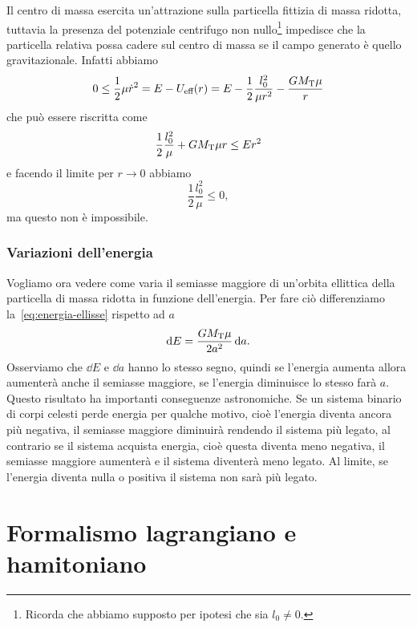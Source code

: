 Il centro di massa esercita un'attrazione sulla particella fittizia di massa
ridotta, tuttavia la presenza del potenziale centrifugo non
nullo\footnote{Ricorda che abbiamo supposto per ipotesi che sia $l_0\neq 0$.}
impedisce che la particella relativa possa cadere sul centro di massa se il
campo generato è quello gravitazionale. Infatti abbiamo
\begin{equation}
  0\leq \frac{1}{2}\mu\dot{r}^2 = E - U_\textup{eff}(r) = E -
  \frac{1}{2}\frac{l_0^2}{\mu r^2} - \frac{GM_\textup{T}\mu}{r}
\end{equation}
che può essere riscritta come
\begin{equation}
  \frac{1}{2}\frac{l_0^2}{\mu} + GM_\textup{T}\mu r \leq Er^2
\end{equation}
e facendo il limite per $r \to 0$ abbiamo
\begin{equation}
  \frac{1}{2}\frac{l_0^2}{\mu} \leq 0,
\end{equation}
ma questo non è impossibile.

\subsubsection{Variazioni dell'energia}
\label{sec:variazioni energia}

Vogliamo ora vedere come varia il semiasse maggiore di un'orbita ellittica della
particella di massa ridotta in funzione dell'energia. Per fare ciò differenziamo
la~\eqref{eq:energia-ellisse} rispetto ad $a$
\begin{equation}
  \mathop{}\!\mathrm{d} E = \frac{GM_\textup{T}\mu}{2a^2}\mathop{}\!\mathrm{d} a.
\end{equation}
Osserviamo che $\dd E$ e $\dd a$ hanno lo stesso segno, quindi se l'energia
aumenta allora aumenterà anche il semiasse maggiore, se l'energia diminuisce lo
stesso farà $a$. Questo risultato ha importanti conseguenze astronomiche. Se un
sistema binario di corpi celesti perde energia per qualche motivo, cioè
l'energia diventa ancora più negativa, il semiasse maggiore diminuirà rendendo
il sistema più legato, al contrario se il sistema acquista energia, cioè questa
diventa meno negativa, il semiasse maggiore aumenterà e il sistema diventerà
meno legato. Al limite, se l'energia diventa nulla o positiva il sistema non
sarà più legato.


\section{Formalismo lagrangiano e hamitoniano}
\label{sec:formalismo-lagrange}


